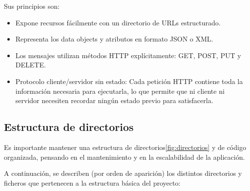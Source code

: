 Sus principios son:


\begin{itemize}
\item Expone recursos fácilmente con un directorio de URLs estructurado.
\item Representa los data objects y atributos en formato JSON o XML.
\item Los mensajes utilizan métodos HTTP explícitamente: GET, POST, PUT y DELETE.
\item Protocolo cliente/servidor sin estado: Cada petición HTTP contiene toda la información necesaria para ejecutarla, lo que permite que ni cliente ni servidor necesiten recordar ningún estado previo para satisfacerla\cite{rest_spring}.
\end{itemize}


\subsection{Estructura de directorios}
Es importante mantener una estructura de directorios\ref{fig:directorios} y de código organizada, pensando en el mantenimiento y en la escalabilidad de la aplicación. 


A continuación, se describen (por orden de aparición) los distintos directorios y ficheros que pertenecen a la estructura básica del proyecto:


